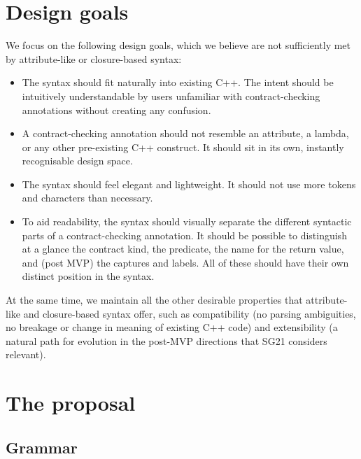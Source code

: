 
\section{Design goals}
\label{sec:design}

We focus on the following design goals, which we believe are not sufficiently met by attribute-like or closure-based syntax:

\begin{itemize}
\item The syntax should fit naturally into existing C++. The intent should be intuitively understandable by users unfamiliar with contract-checking annotations without creating any confusion.
\item A contract-checking annotation should not resemble an attribute, a lambda, or any other pre-existing C++ construct. It should sit in its own, instantly recognisable design space.
\item The syntax should feel elegant and lightweight. It should not use more tokens and characters than necessary.
\item To aid readability, the syntax should visually separate the different syntactic parts of a contract-checking annotation. It should be possible to distinguish at a glance the contract kind, the predicate, the name for the return value, and (post MVP) the captures and labels. All of these should have their own distinct position in the syntax.
\end{itemize}

 At the same time, we maintain all the other desirable properties that attribute-like and closure-based syntax offer, such as compatibility (no parsing ambiguities, no breakage or change in meaning of existing C++ code) and extensibility (a natural path for evolution in the post-MVP directions that SG21 considers relevant).
 

\section{The proposal}

\subsection{Grammar}
\label{subsec:grammar}

